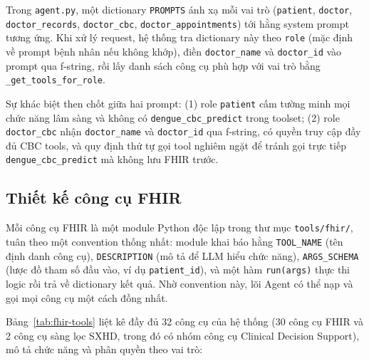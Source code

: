 \documentclass[a4paper,13pt,3p,oneside]{report}
\theoremstyle{definition}
\theoremstyle{remark}
\theoremstyle{definition}
\begin{document}
Trong \texttt{agent.py}, một dictionary \texttt{PROMPTS} ánh xạ mỗi vai trò (\texttt{patient}, \texttt{doctor}, \texttt{doctor\_records}, \texttt{doctor\_cbc}, \texttt{doctor\_appointments}) tới hằng system prompt tương ứng. Khi xử lý request, hệ thống tra dictionary này theo \texttt{role} (mặc định về prompt bệnh nhân nếu không khớp), điền \texttt{doctor\_name} và \texttt{doctor\_id} vào prompt qua f-string, rồi lấy danh sách công cụ phù hợp với vai trò bằng \texttt{\_get\_tools\_for\_role}.

Sự khác biệt then chốt giữa hai prompt: (1) role \texttt{patient} cấm tường minh mọi chức năng lâm sàng và không có \texttt{dengue\_cbc\_predict} trong toolset; (2) role \texttt{doctor\_cbc} nhận \texttt{doctor\_name} và \texttt{doctor\_id} qua f-string, có quyền truy cập đầy đủ CBC tools, và quy định thứ tự gọi tool nghiêm ngặt để tránh gọi trực tiếp \texttt{dengue\_cbc\_predict} mà không lưu FHIR trước.

\subsection{Thiết kế công cụ FHIR}

Mỗi công cụ FHIR là một module Python độc lập trong thư mục \texttt{tools/fhir/}, tuân theo một convention thống nhất: module khai báo hằng \texttt{TOOL\_NAME} (tên định danh công cụ), \texttt{DESCRIPTION} (mô tả để LLM hiểu chức năng), \texttt{ARGS\_SCHEMA} (lược đồ tham số đầu vào, ví dụ \texttt{patient\_id}), và một hàm \texttt{run(args)} thực thi logic rồi trả về dictionary kết quả. Nhờ convention này, lõi Agent có thể nạp và gọi mọi công cụ một cách đồng nhất.

Bảng~\ref{tab:fhir-tools} liệt kê đầy đủ 32 công cụ của hệ thống (30 công cụ FHIR và 2 công cụ sàng lọc SXHD, trong đó có nhóm công cụ Clinical Decision Support), mô tả chức năng và phân quyền theo vai trò:
\end{document}
